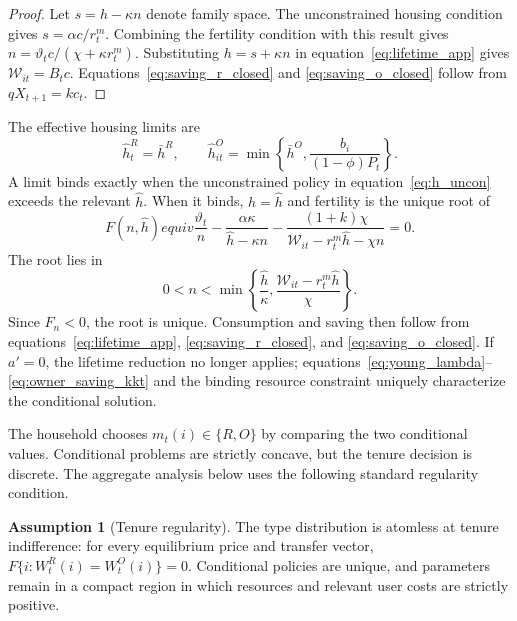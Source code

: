 \documentclass[11pt]{article}
\theoremstyle{definition}
\newtheorem{assumption}{Assumption}
\theoremstyle{remark}
\begin{document}
\begin{proof}
Let $s=h-\kappa n$ denote family space.  The unconstrained housing condition
gives $s=\alpha c/r_t^m$.  Combining the fertility condition with this result
gives $n=\vartheta_t c/(\chi+\kappa r_t^m)$.  Substituting
$h=s+\kappa n$ in equation~\eqref{eq:lifetime_app} gives
$\mathcal W_{it}=B_tc$.  Equations~\eqref{eq:saving_r_closed} and
\eqref{eq:saving_o_closed} follow from $qX_{t+1}=kc_t$.
\end{proof}

The effective housing limits are
\begin{equation}
 \widehat h_t^R=\bar h^R,\qquad
 \widehat h_{it}^O=\min\left\{\bar h^O,
 \frac{b_i}{(1-\phi)P_t}\right\}.
 \label{eq:effective_caps}
\end{equation}
A limit binds exactly when the unconstrained policy in
equation~\eqref{eq:h_uncon} exceeds the relevant $\widehat h$.  When it binds,
$h=\widehat h$ and fertility is the unique root of
\begin{equation}
 F(n,\widehat h)equiv
 \frac{\vartheta_t}{n}
 -\frac{\alpha\kappa}{\widehat h-\kappa n}
 -\frac{(1+k)\chi}
 {\mathcal W_{it}-r_t^m\widehat h-\chi n}=0.
 \label{eq:binding_cap_root}
\end{equation}
The root lies in
\begin{equation}
 0<n<\min\left\{\frac{\widehat h}{\kappa},
 \frac{\mathcal W_{it}-r_t^m\widehat h}{\chi}\right\}.
 \label{eq:binding_cap_domain}
\end{equation}
Since $F_n<0$, the root is unique.  Consumption and saving then follow from
equations~\eqref{eq:lifetime_app}, \eqref{eq:saving_r_closed}, and
\eqref{eq:saving_o_closed}.  If $a'=0$, the lifetime reduction no longer
applies; equations~\eqref{eq:young_lambda}--\eqref{eq:owner_saving_kkt} and the
binding resource constraint uniquely characterize the conditional solution.

The household chooses $m_t(i)\in\{R,O\}$ by comparing the two conditional
values.  Conditional problems are strictly concave, but the tenure decision is
discrete.  The aggregate analysis below uses the following standard
regularity condition.

\begin{assumption}[Tenure regularity]
The type distribution is atomless at tenure indifference: for every equilibrium
price and transfer vector,
$F\{i:W_t^R(i)=W_t^O(i)\}=0$.  Conditional policies are unique, and parameters
remain in a compact region in which resources and relevant user costs are
strictly positive.
\label{ass:tenure_regular}
\end{assumption}
\end{document}
